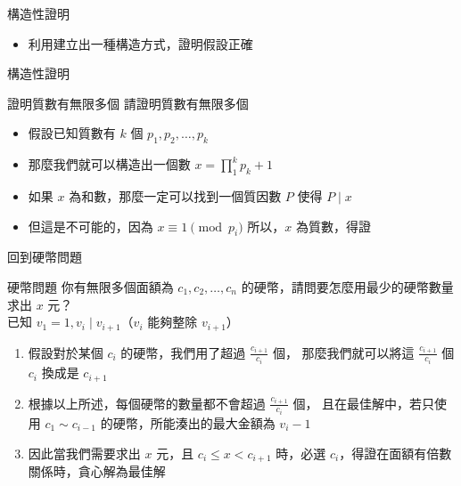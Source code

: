 \documentclass[aspectratio=169]{beamer}
\begin{document}
    \begin{frame}{構造性證明}
        \begin{itemize}
            \item 利用建立出一種構造方式，證明假設正確
        \end{itemize}
    \end{frame}

    \begin{frame}{構造性證明}
        \begin{block}{證明質數有無限多個}
            請證明質數有無限多個
        \end{block}

        \begin{itemize}
            \item<1-> 假設已知質數有 $k$ 個 $p_1, p_2, \dots, p_k$
            \item<2-> 那麼我們就可以構造出一個數 $x = \prod_{1}^{k}{p_k} + 1$
            \item<3-> 如果 $x$ 為和數，那麼一定可以找到一個質因數 $P$ 使得 $P \mid x$
            \item<4-> 但這是不可能的，因為 $x \equiv 1 \pmod{p_i}$ 所以，$x$ 為質數，得證
        \end{itemize}
    \end{frame}

    \begin{frame}{回到硬幣問題}
        \begin{block}{硬幣問題}
            你有無限多個面額為 $c_1, c_2, \dots, c_n$ 的硬幣，請問要怎麼用最少的硬幣數量求出 $x$ 元？\\
            已知 $v_1 = 1, v_i \mid v_{i + 1}$（$v_i$ 能夠整除 $v_{i + 1}$）
        \end{block}

        \begin{enumerate}
            \item<1-> 假設對於某個 $c_i$ 的硬幣，我們用了超過 $\frac{c_{i + 1}}{c_i}$ 個，
            那麼我們就可以將這 $\frac{c_{i + 1}}{c_i}$ 個 $c_i$ 換成是 $c_{i + 1}$
            \item<2-> 根據以上所述，每個硬幣的數量都不會超過 $\frac{c_{i + 1}}{c_i}$ 個，
            且在最佳解中，若只使用 $c_1 \sim c_{i - 1}$ 的硬幣，所能湊出的最大金額為 $v_{i} - 1$
            \item<3-> 因此當我們需要求出 $x$ 元，且 $c_i \le x < c_{i + 1}$ 時，必選 $c_i$，得證在面額有倍數關係時，貪心解為最佳解
        \end{enumerate}
    \end{frame}
\end{document}
